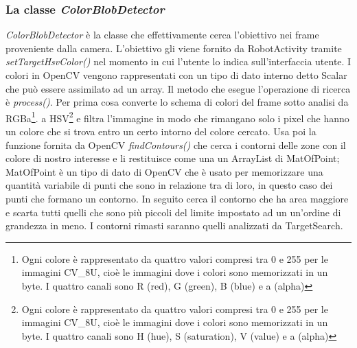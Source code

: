 \subsubsection{La classe \emph{ColorBlobDetector}}
\emph{ColorBlobDetector} è la classe che effettivamente cerca l'obiettivo nei
frame proveniente dalla camera. L'obiettivo gli viene fornito da RobotActivity 
tramite \emph{setTargetHsvColor()} nel momento in cui l'utente lo indica 
sull'interfaccia utente. I colori in OpenCV vengono rappresentati con un tipo di dato interno
detto Scalar che può essere assimilato ad un array. Il metodo che esegue 
l'operazione di ricerca è \emph{process()}. Per prima cosa converte lo schema di 
colori del frame sotto analisi da RGBa\footnote{Ogni colore è rappresentato da 
quattro valori compresi tra 0 e 255 per le immagini CV\_8U, cioè le immagini dove 
i colori sono memorizzati in un byte. I quattro canali sono R (red), G (green), 
B (blue) e a (alpha) }. a HSV\footnote{Ogni colore è rappresentato da quattro 
valori compresi tra 0 e 255 per le immagini CV\_8U, cioè le immagini dove 
i colori sono memorizzati in un byte. I quattro canali sono H (hue), S (saturation), 
V (value) e  a (alpha)} e filtra l'immagine in modo che rimangano solo 
i pixel che hanno un colore che si trova entro un certo intorno del colore cercato.
Usa poi la funzione fornita da OpenCV \emph{findContours()} che cerca i contorni delle
zone con il colore di nostro interesse e li restituisce come una un ArrayList di MatOfPoint;
MatOfPoint è un tipo di dato di OpenCV che è usato per memorizzare una quantità variabile
di punti che sono in relazione tra di loro, in questo caso dei punti che formano un contorno.
In seguito cerca il contorno che ha area maggiore e scarta tutti quelli che sono più piccoli 
del limite impostato ad un un'ordine di grandezza in meno. I contorni rimasti 
saranno quelli analizzati da TargetSearch.


